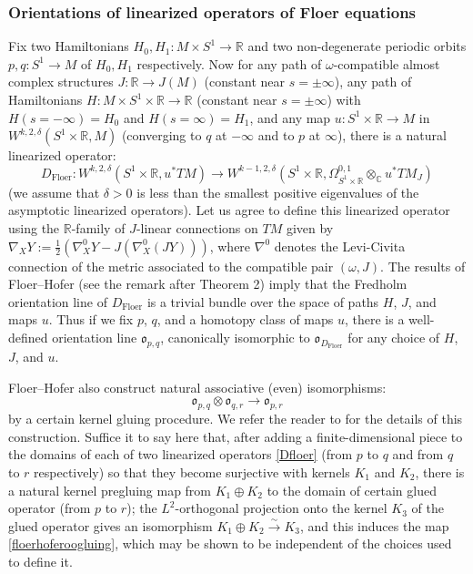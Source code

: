\documentclass[12pt]{article}
\theoremstyle{definition}
\theoremstyle{remark}
\numberwithin{equation}{subsection}
\newcommand{\oo}{\mathfrak o}
\newcommand{\CC}{\mathbb C}
\newcommand{\RR}{\mathbb R}
\begin{document}
\subsubsection{Orientations of linearized operators of Floer equations}

Fix two Hamiltonians $H_0,H_1:M\times S^1\to\RR$ and two non-degenerate periodic orbits $p,q:S^1\to M$ of $H_0,H_1$ respectively.  Now for any path of $\omega$-compatible almost complex structures $J:\RR\to J(M)$ (constant near $s=\pm\infty$), any path of Hamiltonians $H:M\times S^1\times\RR\to\RR$ (constant near $s=\pm\infty$) with $H(s=-\infty)=H_0$ and $H(s=\infty)=H_1$, and any map $u:S^1\times\RR\to M$ in $W^{k,2,\delta}(S^1\times\RR,M)$ (converging to $q$ at $-\infty$ and to $p$ at $\infty$), there is a natural linearized operator:
\begin{equation}\label{Dfloer}
D_\text{Floer}:W^{k,2,\delta}(S^1\times\RR,u^\ast TM)\to W^{k-1,2,\delta}(S^1\times\RR,\Omega^{0,1}_{S^1\times\RR}\otimes_\CC u^\ast TM_J)
\end{equation}
(we assume that $\delta>0$ is less than the smallest positive eigenvalues of the asymptotic linearized operators).  Let us agree to define this linearized operator using the $\RR$-family of $J$-linear connections on $TM$ given by $\nabla_XY:=\frac 12(\nabla^0_XY-J(\nabla^0_X(JY)))$, where $\nabla^0$ denotes the Levi-Civita connection of the metric associated to the compatible pair $(\omega,J)$.  The results of Floer--Hofer \cite{floerhoferorientations} (see the remark after Theorem 2) imply that the Fredholm orientation line of $D_\text{Floer}$ is a trivial bundle over the space of paths $H$, $J$, and maps $u$.  Thus if we fix $p$, $q$, and a homotopy class of maps $u$, there is a well-defined orientation line $\oo_{p,q}$, canonically isomorphic to $\oo_{D_\text{Floer}}$ for any choice of $H$, $J$, and $u$.

Floer--Hofer \cite[Theorem 10]{floerhoferorientations} also construct natural associative (even) isomorphisms:
\begin{equation}\label{floerhoferoogluing}
\oo_{p,q}\otimes\oo_{q,r}\to\oo_{p,r}
\end{equation}
by a certain kernel gluing procedure.  We refer the reader to \cite{floerhoferorientations} for the details of this construction.  Suffice it to say here that, after adding a finite-dimensional piece to the domains of each of two linearized operators \eqref{Dfloer} (from $p$ to $q$ and from $q$ to $r$ respectively) so that they become surjective with kernels $K_1$ and $K_2$, there is a natural kernel pregluing map from $K_1\oplus K_2$ to the domain of certain glued operator (from $p$ to $r$); the $L^2$-orthogonal projection onto the kernel $K_3$ of the glued operator gives an isomorphism $K_1\oplus K_2\xrightarrow\sim K_3$, and this induces the map \eqref{floerhoferoogluing}, which may be shown to be independent of the choices used to define it.
\end{document}
